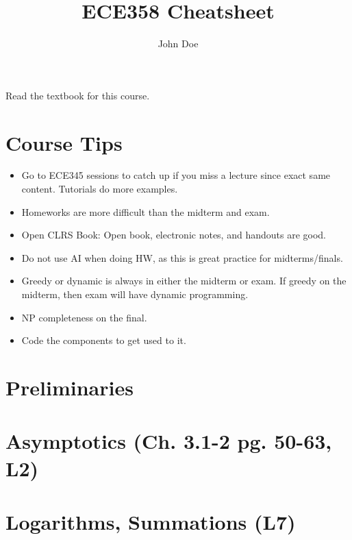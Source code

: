\documentclass{article}
\title{ECE358 Cheatsheet}
\author{John Doe}
\begin{document}
\maketitle

\tableofcontents

\listoffigures

\listoftables

Read the textbook for this course. 

\section{Course Tips}
\begin{intuition}
    \begin{itemize}
        \item Go to ECE345 sessions to catch up if you miss a lecture since exact same content. Tutorials do more examples. 
        \item Homeworks are more difficult than the midterm and exam.
        \item Open CLRS Book: Open book, electronic notes, and handouts are good. 
        \item Do not use AI when doing HW, as this is great practice for midterms/finals.
        \item Greedy or dynamic is always in either the midterm or exam. If greedy on the midterm, then exam will have dynamic programming. 
        \item NP completeness on the final. 
        \item Code the components to get used to it. 
    \end{itemize}
\end{intuition}

\section{Preliminaries}

\newpage

\section{Asymptotics (Ch. 3.1-2 pg. 50-63, L2)} 

\newpage

\section{Logarithms, Summations (L7)} %

\newpage
\end{document}
